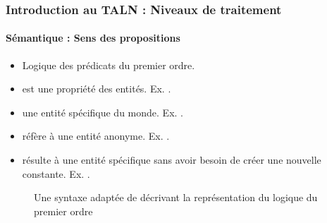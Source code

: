 \documentclass[xcolor=table]{beamer}
\begin{document}
\begin{frame}
\frametitle{Introduction au TALN : Niveaux de traitement}
\framesubtitle{Sémantique : Sens des propositions}

\begin{minipage}{0.5\textwidth}
\begin{itemize}
	\item Logique des prédicats du premier ordre.
	\item {} est une propriété des entités. 
	Ex. .	
	\item {} une entité spécifique du monde. 
	Ex. .
	\item {} réfère à une entité anonyme. 
	Ex. .
	\item {} résulte à une entité spécifique sans avoir besoin de créer une nouvelle constante. 
	Ex. .
\end{itemize}
\end{minipage}
\begin{minipage}{0.48\textwidth}
	\begin{figure}
		\caption{Une syntaxe adaptée de \cite{2002-russell-norvig} décrivant la représentation du logique du premier ordre \cite{2019-jurafsky-martin}}
	\end{figure}
\end{minipage}

\end{frame}
\end{document}
